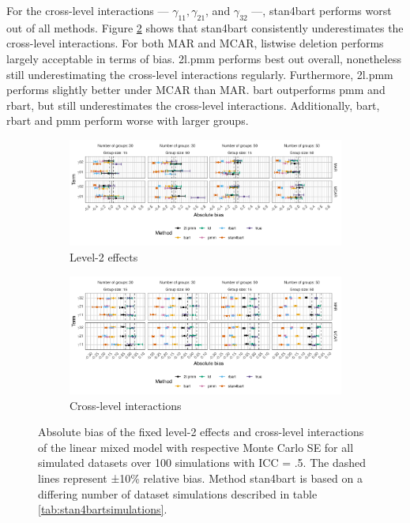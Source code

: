 \documentclass[3p,12pt,a4paper]{elsarticle}
\begin{document}
For the cross-level interactions --- $\gamma_{11}, \gamma_{21}$, and $\gamma_{32}$ ---, stan4bart performs worst out of all methods. Figure \ref{fig:biascrosslevel} shows that stan4bart consistently underestimates the cross-level interactions. For both MAR and MCAR, listwise deletion performs largely acceptable in terms of bias. 2l.pmm performs best out overall, nonetheless still underestimating the cross-level interactions regularly. Furthermore, 2l.pmm performs slightly better under MCAR than MAR. bart outperforms pmm and rbart, but still underestimates the cross-level interactions. Additionally, bart, rbart and pmm perform worse with larger groups. 

\begin{figure}[H]
    \centering 
    \begin{subfigure}[b]{1\textwidth}
        \centering
        \includegraphics[width=1\textwidth]{biaslevel2.png}
        \caption{Level-2 effects}
        \label{fig:biaslevel2}
    \end{subfigure}
    \begin{subfigure}[b]{1\textwidth}
        \centering
        \includegraphics[width=1\textwidth]{biascrosslevel.png}
        \caption{Cross-level interactions}
        \label{fig:biascrosslevel}
    \end{subfigure}
    \caption{Absolute bias of the fixed level-2 effects and cross-level interactions of the linear mixed model with respective Monte Carlo SE for all simulated datasets over 100 simulations with ICC = .5. The dashed lines represent ±10\% relative bias. Method stan4bart is based on a differing number of dataset simulations described in table \ref{tab:stan4bartsimulations}.}
    \label{fig:biaslevel2crosslevel}
\end{figure}
\end{document}

